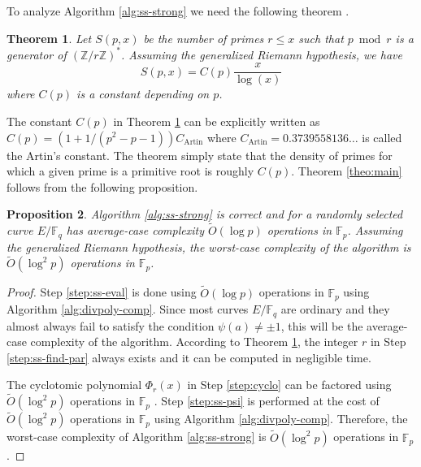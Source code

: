 \documentclass[12pt]{article}
\theoremstyle{plain}
\newtheorem{theorem}{Theorem}
\newtheorem{proposition}[theorem]{Proposition}
\theoremstyle{definition}
\newcommand{\tildO}{\tilde{O}}
\def\Z{\ensuremath{\mathbb{Z}}}
\def\F{\ensuremath{\mathbb{F}}}
\begin{document}
To analyze Algorithm \ref{alg:ss-strong} we need the following theorem \cite{hooley1967artin, 
matthews1976generalisation, finch2003mathematical}.
\begin{theorem}
	\label{theo:Artin}
	Let $S(p, x)$ be the number of primes $r \le x$ such that $p \bmod r$ is a generator of 
	$(\Z/r\Z)^*$. Assuming the generalized Riemann hypothesis, we have 
	\[ S(p, x) = C(p)\frac{x}{\log(x)}\]
	where $C(p)$ is a constant depending on $p$.
\end{theorem}
The constant $C(p)$ in Theorem \ref{theo:Artin} can be explicitly written as $C(p) = (1 + 1 / (p^2 
- p - 1))C_{\text{Artin}}$ where $C_{\text{Artin}} = 0.3739558136\dots$ is called the Artin's 
constant. The theorem simply state that the density of primes for which a given prime is a 
primitive root is roughly $C(p)$. Theorem \ref{theo:main} follows from the following proposition.
\begin{proposition}
	\label{prop:ss-strong}
	Algorithm \ref{alg:ss-strong} is correct and for a randomly selected curve $E/\F_q$ has 
	average-case complexity $\tildO(\log p)$ operations in $\F_p$. Assuming the generalized Riemann 
	hypothesis, the worst-case complexity of the algorithm is $\tildO(\log^2 p)$ operations in 
	$\F_p$.
\end{proposition}
\begin{proof}
	Step \ref{step:ss-eval} is done using $\tildO(\log p)$ operations in $\F_p$ using Algorithm 
	\ref{alg:divpoly-comp}. Since most curves $E/\F_q$ are ordinary and they almost always fail to 
	satisfy the condition $\psi(a) \ne \pm 1$, this will be the average-case complexity of the 
	algorithm. According to Theorem \ref{theo:Artin}, the integer $r$ in Step  
	\ref{step:ss-find-par} always exists and it can be computed in negligible time. 
	
	The cyclotomic polynomial $\Phi_r(x)$ in Step \ref{step:cyclo} can be factored using 
	$\tildO(\log^2p)$ operations in $\F_p$ \cite{shoup1994}. Step \ref{step:ss-psi} is performed at 
	the cost of $\tildO(\log^2p)$ operations in $\F_p$ using Algorithm \ref{alg:divpoly-comp}. 
	Therefore, the worst-case complexity of Algorithm \ref{alg:ss-strong} is $\tildO(\log^2 p)$ 
	operations in $\F_p$.
\end{proof}
\end{document}
